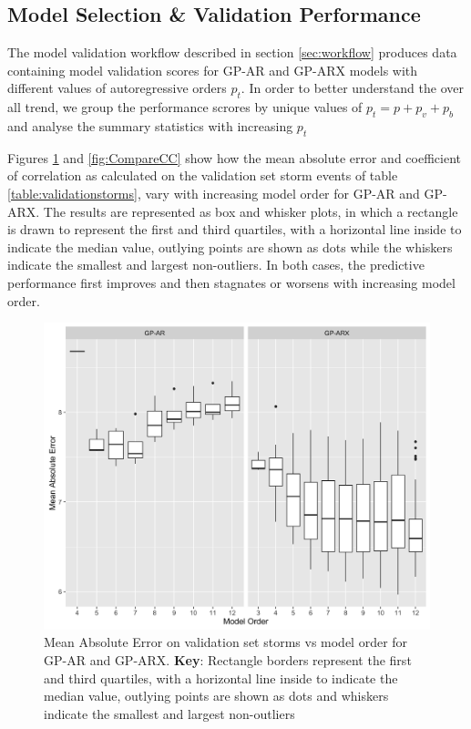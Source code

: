 \documentclass{article}
\begin{document}
\subsection*{Model Selection \& Validation Performance}

The model validation workflow described in section \ref{sec:workflow}
produces data containing model validation scores for GP-AR and GP-ARX
models with different values of autoregressive orders $p_t$. In order
to better understand the over all trend, we group the performance
scrores by unique values of $p_t = p + p_v + p_b$ and analyse the
summary statistics with increasing $p_t$

Figures \ref{fig:CompareMae} and \ref{fig:CompareCC} show how the mean
absolute error and coefficient of correlation as calculated on the
validation set storm events of table \ref{table:validationstorms},
vary with increasing model order for GP-AR and GP-ARX. The results are
represented as box and whisker plots, in which a rectangle is drawn to
represent the first and third quartiles, with a horizontal line inside
to indicate the median value, outlying points are shown as dots while
the whiskers indicate the smallest and largest non-outliers. In both
cases, the predictive performance first improves and then stagnates or
worsens with increasing model order. 

\begin{figure}[h]
  \includegraphics[width=\textwidth]{Compare-mae.png}
  \caption{Mean Absolute Error on validation set storms vs model order for GP-AR and GP-ARX. \textbf{Key}: Rectangle borders represent the first and third quartiles, with a horizontal line inside to indicate the median value, outlying points are shown as dots and whiskers indicate the smallest and largest non-outliers}
  \label{fig:CompareMae}
\end{figure}
\end{document}
